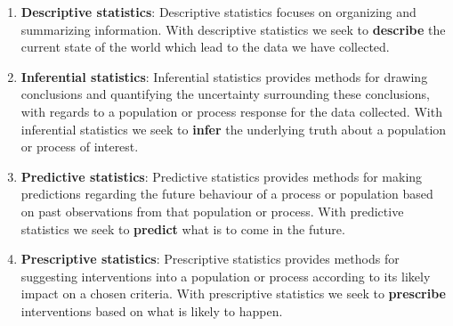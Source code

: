 \documentclass[
  letterpaper,
  DIV=11,
  numbers=noendperiod]{scrreprt}
\providecommand{\tightlist}{%
  \setlength{\itemsep}{0pt}\setlength{\parskip}{0pt}}\usepackage{longtable,booktabs,array}
\theoremstyle{definition}
\theoremstyle{definition}
\theoremstyle{definition}
\theoremstyle{remark}
\begin{document}
\begin{enumerate}
\def\labelenumi{\arabic{enumi}.}
\tightlist
\item
  \textbf{Descriptive statistics}: Descriptive statistics focuses on
  organizing and summarizing information. With descriptive statistics we
  seek to \textbf{describe} the current state of the world which lead to
  the data we have collected.
\item
  \textbf{Inferential statistics}: Inferential statistics provides
  methods for drawing conclusions and quantifying the uncertainty
  surrounding these conclusions, with regards to a population or process
  response for the data collected. With inferential statistics we seek
  to \textbf{infer} the underlying truth about a population or process
  of interest.
\item
  \textbf{Predictive statistics}: Predictive statistics provides methods
  for making predictions regarding the future behaviour of a process or
  population based on past observations from that population or process.
  With predictive statistics we seek to \textbf{predict} what is to come
  in the future.
\item
  \textbf{Prescriptive statistics}: Prescriptive statistics provides
  methods for suggesting interventions into a population or process
  according to its likely impact on a chosen criteria. With prescriptive
  statistics we seek to \textbf{prescribe} interventions based on what
  is likely to happen.
\end{enumerate}
\end{document}
